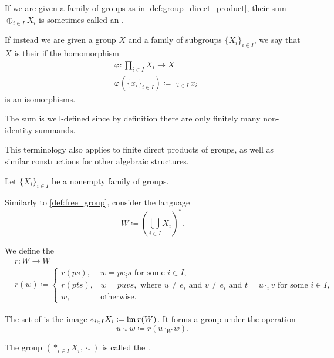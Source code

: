 \begin{remark}\label{def:group_direct_sum_external_internal}\cite[126]{Knapp2016BAlg}
  If we are given a family of groups as in \cref{def:group_direct_product}, their sum \( \oplus_{i \in I} X_i \) is sometimes called an .

  If instead we are given a group \( X \) and a family of subgroups \( \{ X_i \}_{i \in I} \), we say that \( X \) is their  if the homomorphism
  \begin{align*}
    &\varphi: \prod_{i \in I} X_i \to X \\
    &\varphi(\{ x_i \}_{i \in I}) \coloneqq \cdot_{i \in I} x_i
  \end{align*}
  is an isomorphisms.

  The sum is well-defined since by definition there are only finitely many non-identity summands.

  This terminology also applies to finite direct products of groups, as well as similar constructions for other algebraic structures.
\end{remark}

\begin{definition}\label{def:group_free_product}\cite[323]{Knapp2016BAlg}
  Let \( \{ X_i \}_{i \in I} \) be a nonempty family of groups.

  Similarly to \cref{def:free_group}, consider the language
  \begin{equation*}
    W \coloneqq \left( \bigcup_{i \in I} X_i \right)^{*}.
  \end{equation*}

  We define the 
  \begin{align*}
    &r: W \to W \\
    &r(w) \coloneqq \begin{cases}
      r(ps), &w = p e_i s \text{ for some } i \in I, \\
      r(pts), &w = puvs, \text{ where } u \neq e_i \text{ and } v \neq e_i \text{ and } t = u \cdot_i v \text{ for some } i \in I, \\
      w, &\text{otherwise}.
    \end{cases}
  \end{align*}

  The set of  is the image \( \ast_{i \in I} X_i \coloneqq \operatorname{im} r(W) \). It forms a group under the operation
  \begin{equation*}
    u \cdot_\ast w \coloneqq r(u \cdot_{W} w).
  \end{equation*}

  The group \( (\ast_{i \in I} X_i, \cdot_\ast) \) is called the .
\end{definition}

